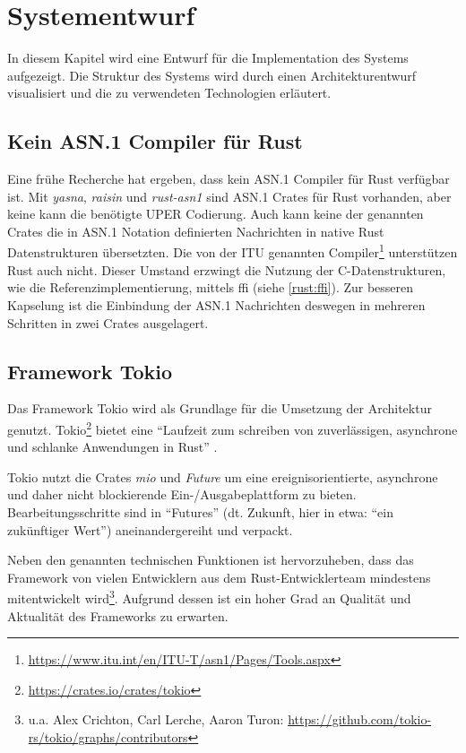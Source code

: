 
\chapter{Systementwurf}

In diesem Kapitel wird eine Entwurf für die Implementation des Systems aufgezeigt.
Die Struktur des Systems wird durch einen Architekturentwurf visualisiert und die zu verwendeten Technologien erläutert.

\section{Kein ASN.1 Compiler für Rust}

Eine frühe Recherche hat ergeben, dass kein ASN.1 Compiler für Rust verfügbar ist.
Mit \textit{yasna}, \textit{raisin} und \textit{rust-asn1} sind ASN.1 Crates für Rust vorhanden, aber keine kann die benötigte UPER Codierung.
Auch kann keine der genannten Crates die in ASN.1 Notation definierten Nachrichten in native Rust Datenstrukturen übersetzten.
Die von der ITU genannten Compiler\footnote{\url{https://www.itu.int/en/ITU-T/asn1/Pages/Tools.aspx}} unterstützen Rust auch nicht.
Dieser Umstand erzwingt die Nutzung der C-Datenstrukturen, wie die Referenzimplementierung, mittels \gls{ffi} (siehe \autoref{rust:ffi}).
Zur besseren Kapselung ist die Einbindung der ASN.1 Nachrichten deswegen in mehreren Schritten in zwei Crates ausgelagert.

\section{Framework Tokio}

Das Framework Tokio wird als Grundlage für die Umsetzung der Architektur genutzt.
Tokio\footnote{\url{https://crates.io/crates/tokio}} bietet eine \enquote{Laufzeit zum schreiben von zuverlässigen, asynchrone und schlanke Anwendungen in Rust} \cite{rust:crate:tokio}.

Tokio nutzt die Crates \textit{mio} und \textit{Future} um eine ereignisorientierte, asynchrone und daher nicht blockierende Ein-/Ausgabeplattform zu bieten.
Bearbeitungsschritte sind in \enquote{Futures} (dt. Zukunft, hier in etwa: \enquote{ein zukünftiger Wert}) aneinandergereiht und verpackt.

Neben den genannten technischen Funktionen ist hervorzuheben, dass das Framework von vielen Entwicklern aus dem Rust-Entwicklerteam mindestens mitentwickelt wird\footnote{u.a. Alex Crichton, Carl Lerche, Aaron Turon: \url{https://github.com/tokio-rs/tokio/graphs/contributors}}.
Aufgrund dessen ist ein hoher Grad an Qualität und Aktualität des Frameworks zu erwarten.

